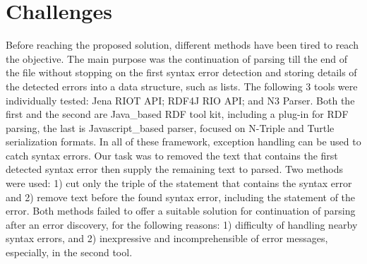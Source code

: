 \section{Challenges }
Before reaching the proposed solution, different methods have been tired to reach the objective. The main purpose was the continuation of parsing till the end of the file without stopping on the first syntax error detection  and storing details of the detected errors into a data structure, such as lists. The following 3 tools were individually tested: Jena RIOT API\cite{McBride:2002:JSW:613357.613755}; RDF4J RIO API\cite{RDF4J:Online}; and  N3 Parser\cite{N3Parser:Online}. Both the first and the second are Java\_based RDF tool kit, including a plug-in for RDF parsing, the last is Javascript\_based parser, focused on N-Triple and Turtle serialization formats. In all of these framework, exception handling can be used to catch syntax errors. Our task was to removed the text that contains the first detected syntax error then supply the remaining text to parsed. Two methods were used: 1) cut only the triple of the statement that contains the syntax error and 2) remove text before the found syntax error, including the statement of the error. Both methods failed to offer a suitable solution for continuation of parsing after an error discovery, for the following reasons: 1) difficulty of handling nearby syntax errors, and 2) inexpressive and incomprehensible of error messages, especially, in the second tool.    




